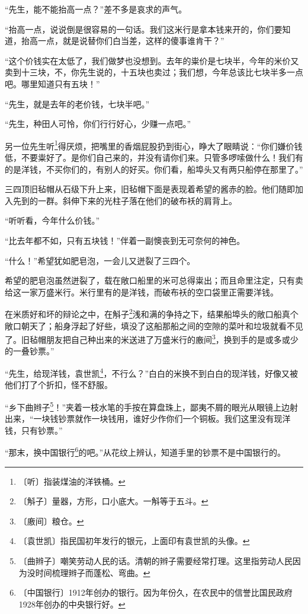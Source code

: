 \documentclass[12pt,UTF-8,openany]{ctexbook}
\begin{document}
\begin{normalsize}
    “先生，能不能抬高一点？”差不多是哀求的声气。
    
    “抬高一点，说说倒是很容易的一句话。我们这米行是拿本钱来开的，你们要知道，抬高一点，就是说替你们白当差，这样的傻事谁肯干？”
    
    “这个价钱实在太低了，我们做梦也没想到。去年的粜价是七块半，今年的米价又卖到十三块，不，你先生说的，十五块也卖过；我们想，今年总该比七块半多一点吧。哪里知道只有五块！”
    
    “先生，就是去年的老价钱，七块半吧。”
    
    “先生，种田人可怜，你们行行好心，少赚一点吧。”
    
    另一位先生听\footnote{〔听〕指装煤油的洋铁桶。}得厌烦，把嘴里的香烟屁股扔到街心，睁大了眼睛说：“你们嫌价钱低，不要粜好了。是你们自己来的，并没有请你们来。只管多啰嗦做什么！我们有的是洋钱，不买你们的，有别人的好买。你们看，船埠头又有两只船停在那里了。”
    
    三四顶旧毡帽从石级下升上来，旧毡帽下面是表现着希望的酱赤的脸。他们随即加入先到的一群。斜伸下来的光柱子落在他们的破布袄的肩背上。
    
    “听听看，今年什么价钱。”
    
    “比去年都不如，只有五块钱！”伴着一副懊丧到无可奈何的神色。
    
    “什么！”希望犹如肥皂泡，一会儿又迸裂了三四个。
    
    希望的肥皂泡虽然迸裂了，载在敞口船里的米可总得粜出；而且命里注定，只有卖给这一家万盛米行。米行里有的是洋钱，而破布袄的空口袋里正需要洋钱。
    
    在米质好和坏的辩论之中，在斛子\footnote{〔斛子〕量器，方形，口小底大。一斛等于五斗。}浅和满的争持之下，结果船埠头的敞口船真个敞口朝天了；船身浮起了好些，填没了这船那船之间的空隙的菜叶和垃圾就看不见了。旧毡帽朋友把自己种出来的米送进了万盛米行的廒间\footnote{〔廒间〕粮仓。}，换到手的是或多或少的一叠钞票。”
    
    “先生，给现洋钱，袁世凯\footnote{〔袁世凯〕指民国初年发行的银元，上面印有袁世凯的头像。}，不行么？”白白的米换不到白白的现洋钱，好像又被他们打了个折扣，怪不舒服。
    
    “乡下曲辫子\footnote{〔曲辫子〕嘲笑劳动人民的话。清朝的辫子需要经常打理。这里指劳动人民因为没时间梳理辫子而蓬松、弯曲。}！”夹着一枝水笔的手按在算盘珠上，鄙夷不屑的眼光从眼镜上边射出来，“一块钱钞票就作一块钱用，谁好少作你们一个铜板。我们这里没有现洋钱，只有钞票。”
    
    “那末，换中国银行\footnote{〔中国银行〕1912年创办的银行。因为年份久，在农民中的信誉比国民政府1928年创办的中央银行好。}的吧。”从花纹上辨认，知道手里的钞票不是中国银行的。
    

\end{normalsize}
\end{document}
